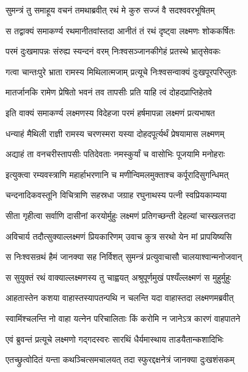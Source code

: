 \twolineshloka
{सुमन्त्रं तु समाहूय वचनं तमथाब्रवीत्}
{रथं मे कुरु सज्जं वै सदश्ववरभूषितम्}%

\twolineshloka
{स तद्वाक्यं समाकर्ण्य रथमानीतवांस्तदा}
{आनीतं तं रथं दृष्ट्वा लक्ष्मणः शोककर्षितः}%

\twolineshloka
{परमं दुःखमापन्नः संरुह्य स्यन्दनं वरम्}
{निःश्वसञ्जानकीगेहं प्रतस्थे भ्रातृसेवकः}%

\twolineshloka
{गत्वा चान्तःपुरे भ्राता रामस्य मिथिलात्मजाम्}
{प्रत्यूचे निःश्वसन्वाक्यं दुःखपूरपरिप्लुतः}%

\twolineshloka
{मातर्जानकि रामेण प्रेषितो भवनं तव}
{तापसीः प्रति याहि त्वं दोहदप्राप्तिहेतवे}%

\twolineshloka
{इति वाक्यं समाकर्ण्य लक्ष्मणस्य विदेहजा}
{परमं हर्षमापन्ना लक्ष्मणं प्रत्यभाषत}%


\twolineshloka
{धन्याहं मैथिली राज्ञी रामस्य चरणस्मरा}
{यस्या दोहदपूर्त्यर्थं प्रेषयामास लक्ष्मणम्}%

\twolineshloka
{अद्याहं ता वनचरीस्तापसीः पतिदेवताः}
{नमस्कुर्यां च वासोभिः पूजयामि मनोहराः}%

\twolineshloka
{इत्युक्त्वा रम्यवस्त्राणि महार्हाभरणानि च}
{मणीन्विमलमुक्ताश्च कर्पूरादिसुगन्धिमत्}%

\twolineshloka
{चन्दनादिकवस्तूनि विचित्राणि सहस्रधा}
{जग्राह रघुनाथस्य पत्नी स्वप्रियकाम्यया}%

\twolineshloka
{सीता गृहीत्वा सर्वाणि दासीनां करयोर्मुहुः}
{लक्ष्मणं प्रतिगच्छन्ती देहल्यां चास्खलत्तदा}%

\twolineshloka
{अविचार्य तदौत्सुक्याल्लक्ष्मणं प्रियकारिणम्}
{उवाच कुत्र सरथो येन मां प्रापयिष्यसि}%

\twolineshloka
{स निःश्वसन्रथं हैमं जानक्या सह निर्विशत्}
{सुमन्त्रं प्रत्युवाचासौ चालयाश्वान्मनोजवान्}%

\twolineshloka
{स सुयुक्तं रथं वाक्याल्लक्ष्मणस्य तु चाह्वयत्}
{अश्रुपूर्णमुखं पश्यँल्लक्ष्मणं स मुहुर्मुहुः}%

\twolineshloka
{आहतास्तेन कशया वाहास्तस्यापतन्पथि}
{न चलन्ति यदा वाहास्तदा लक्ष्मणमब्रवीत्}%


\twolineshloka
{स्वामिंश्चलन्ति नो वाहा यत्नेन परिचालिताः}
{किं करोमि न जानेऽत्र कारणं वाहपातने}%

\twolineshloka
{एवं ब्रुवन्तं प्रत्यूचे लक्ष्मणो गद्गदस्वरः}
{सारथिं धैर्यमास्थाय ताडयैतान्कशादिभिः}%

\twolineshloka
{एतच्छ्रुत्वोदितं यन्ता कथञ्चित्समचालयत्}
{तदा स्फुरद्दक्षनेत्रं जानक्या दुःखशंसकम्}%

